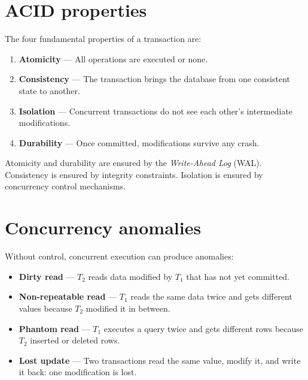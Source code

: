 \section{ACID properties}

\begin{definition}
The four fundamental properties of a transaction are:
\begin{enumerate}
  \item \textbf{Atomicity} --- All operations are executed or none.
  \item \textbf{Consistency} --- The transaction brings the database from
        one consistent state to another.
  \item \textbf{Isolation} --- Concurrent transactions do not see each
        other's intermediate modifications.
  \item \textbf{Durability} --- Once committed, modifications survive any
        crash.
\end{enumerate}
\end{definition}

\begin{remark}
Atomicity and durability are ensured by the \emph{Write-Ahead Log} (WAL).
Consistency is ensured by integrity constraints. Isolation is ensured by
concurrency control mechanisms.
\end{remark}

\section{Concurrency anomalies}

Without control, concurrent execution can produce anomalies:

\begin{definition}
\begin{itemize}
  \item \textbf{Dirty read} --- $T_2$ reads data modified by $T_1$ that has
        not yet committed.
  \item \textbf{Non-repeatable read} --- $T_1$ reads the same data twice and
        gets different values because $T_2$ modified it in between.
  \item \textbf{Phantom read} --- $T_1$ executes a query twice and gets
        different rows because $T_2$ inserted or deleted rows.
  \item \textbf{Lost update} --- Two transactions read the same value,
        modify it, and write it back: one modification is lost.
\end{itemize}
\end{definition}

